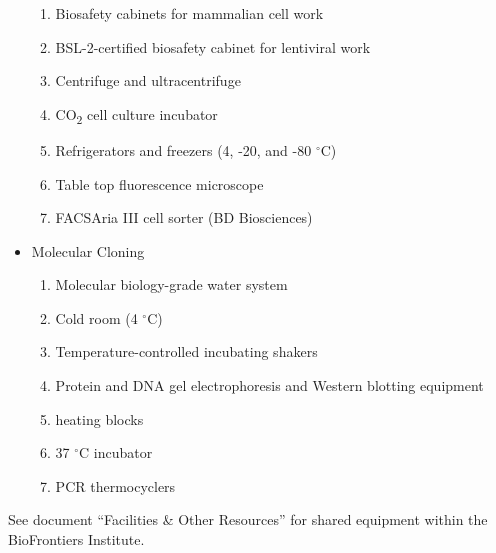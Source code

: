 \documentclass{F32}
\begin{document}
\begin{itemize}
\begin{enumerate}
    \item Biosafety cabinets for mammalian cell work
    \item BSL-2-certified biosafety cabinet for lentiviral work
    \item Centrifuge and ultracentrifuge
    \item CO\textsubscript{2} cell culture incubator
    \item Refrigerators and freezers (4, -20, and -80 $^\circ$C)
    \item Table top fluorescence microscope
    \item FACSAria III cell sorter (BD Biosciences)
  \end{enumerate}
  \item Molecular Cloning \begin{enumerate}
    \item Molecular biology-grade water system
    \item Cold room (4 $^\circ$C)
    \item Temperature-controlled incubating shakers
    \item Protein and DNA gel electrophoresis and Western blotting equipment
    \item heating blocks
    \item 37 $^\circ$C incubator
    \item PCR thermocyclers
  \end{enumerate}
\end{itemize}
See document ``Facilities \& Other Resources'' for shared equipment within the BioFrontiers Institute.
\end{document}
